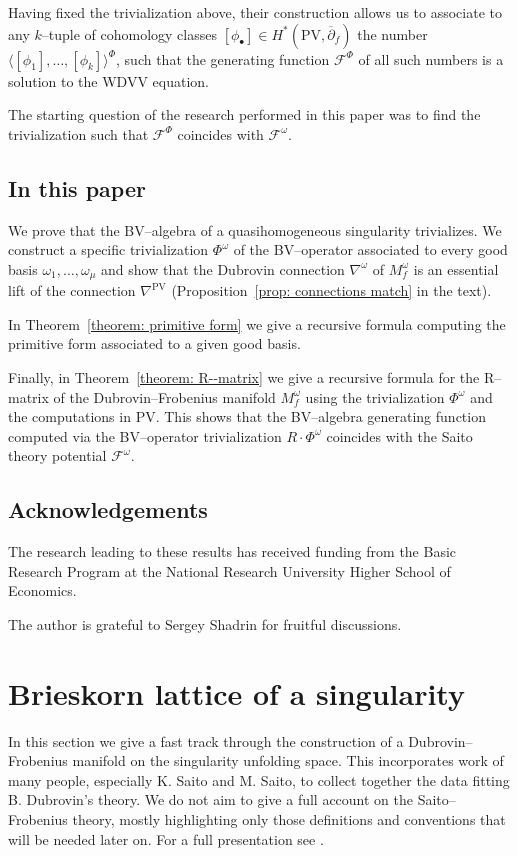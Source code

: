 \documentclass[12pt,a4paper]{amsart}
\newcommand{\F}[2]{{F_{#1}^{#2}}}
\def\F{{\mathcal F}}
\newcommand{\p}{{\partial}}
\newcommand{\<}{\left<}
\renewcommand{\>}{\right>}
\newcommand{\PV}{{\mathrm{PV}}}
\numberwithin{equation}{section}
\begin{document}
Having fixed the trivialization above, their construction allows us to associate to any $k$--tuple of cohomology classes $[\phi_\bullet] \in H^\ast(\PV,\overline \p_f)$ the number $\langle [\phi_1],\dots,[\phi_k] \rangle^\Phi$, such that the generating function $\F^\Phi$ of all such numbers is a solution to the WDVV equation.

The starting question of the research performed in this paper was to find the trivialization such that $\F^\Phi$ coincides with $\F^\omega$.

\subsection{In this paper}
We prove that the BV--algebra of a quasihomogeneous singularity trivializes. We construct a specific trivialization $\Phi^\omega$ of the BV--operator associated to every good basis $\omega_1,\dots,\omega_\mu$ and show that the Dubrovin connection $\nabla^\omega$ of $M_f^\omega$ is an essential lift of the connection $\nabla^\PV$ (Proposition~\ref{prop: connections match} in the text).

In Theorem~\ref{theorem: primitive form} we give a recursive formula computing the primitive form associated to a given good basis.

Finally, in Theorem~\ref{theorem: R--matrix} we give a recursive formula for the R--matrix of the Dubrovin--Frobenius manifold $M^\omega_f$ using the trivialization $\Phi^\omega$ and the computations in $\PV$. This shows that the BV--algebra generating function computed via the BV--operator trivialization $R\cdot \Phi^\omega$ coincides with the Saito theory potential $\F^\omega$.

\subsection{Acknowledgements}
The research leading to these results has received funding from the Basic Research Program at the National Research University Higher School of Economics.

The author is grateful to Sergey Shadrin for fruitful discussions.


\section{Brieskorn lattice of a singularity}\label{section: Saito--Frobenius manifold}
In this section we give a fast track through the construction of a Dubrovin--Frobenius manifold on the singularity unfolding space. This incorporates work of many people, especially K. Saito and M. Saito, to collect together the data fitting B. Dubrovin's theory. We do not aim to give a full account on the Saito--Frobenius theory, mostly highlighting only those definitions and conventions that will be needed later on. For a full presentation see \cite{H}.
\end{document}
